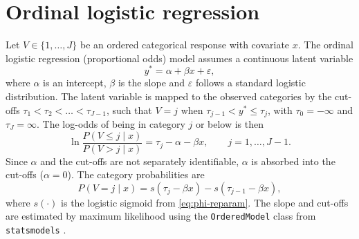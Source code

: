 \section{Ordinal logistic regression}
Let $V \in \{1, \dots, J\}$ be an ordered categorical response with covariate $x$. The
ordinal logistic regression (proportional odds) model assumes a continuous latent variable
\begin{equation}
    y^* = \alpha + \beta x + \varepsilon,
\end{equation}
where $\alpha$ is an intercept, $\beta$ is the slope and $\varepsilon$ follows a standard
logistic distribution. The latent variable is mapped to the observed categories by the
cut-offs $\tau_1 < \tau_2 < \dots < \tau_{J-1}$, such that $V = j$ when
$\tau_{j-1} < y^* \leq \tau_j$, with $\tau_0 = -\infty$ and $\tau_J = \infty$. The log-odds
of being in category $j$ or below is then \parencite{ucla_ologit}
\begin{equation}
    \ln \frac{P(V \leq j \mid x)}{P(V > j \mid x)} = \tau_j - \alpha - \beta x,
    \qquad j = 1, \dots, J-1.
\end{equation}
Since $\alpha$ and the cut-offs are not separately identifiable, $\alpha$ is absorbed into the
cut-offs ($\alpha = 0$). The category probabilities are
\begin{equation}
    P(V = j \mid x) = s(\tau_j - \beta x) - s(\tau_{j-1} - \beta x),
\end{equation}
where $s(\cdot)$ is the logistic sigmoid from \cref{eq:phi-reparam}. The slope and cut-offs
are estimated by maximum likelihood using the \texttt{OrderedModel} class from
\texttt{statsmodels} \parencite{statsmodels_ordered}.

